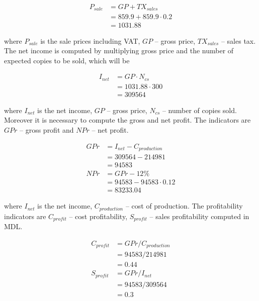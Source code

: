 \begin{equation}
 \begin{split}
  P_{sale} &= GP + TX_{sales}\\
              &= 859.9 + 859.9 \cdot 0.2 \\
              &= 1031.88
 \end{split}
\end{equation}

\noindent
where $P_{sale}$ is the sale prices including VAT, $GP$ -- gross price, $TX_{sales}$ -- sales tax. The net income is computed by multiplying gross price and the number of expected copies to be sold, which will be

\begin{equation}
 \begin{split}
  I_{net} &= GP \cdot N_{cs}\\
              &= 1031.88  \cdot 300 \\
              &= 309564
 \end{split}
\end{equation}

\noindent
where $I_{net}$ is the net income, $GP$ -- gross price, $N_{cs}$ -- number of copies sold. Moreover it is necessary to compute the gross and net profit. The indicators are $GPr$ -- gross profit and $NPr$ -- net profit.

\begin{equation}
 \begin{split}
  GPr &= I_{net} - C_{production}\\
              &= 309564 - 214981\\
              &= 94583\\
  NPr &= GPr - 12\% \\
             &= 94583 - 94583 \cdot 0.12 \\
             &= 83233.04
 \end{split}
\end{equation}

\noindent
where $I_{net}$ is the net income, $C_{production}$ -- cost of production. The profitability indicators are $C_{profit}$ -- cost profitability, $S_{profit}$ -- sales profitability computed in MDL.

\begin{equation}
 \begin{split}
  C_{profit} &= GPr / C_{production}\\
              &= 94583 / 214981\\
              &= 0.44 \\         
  S_{profit} &= GPr / I_{net}\\
             &= 94583 / 309564\\
             &= 0.3\\
 \end{split}
\end{equation}

